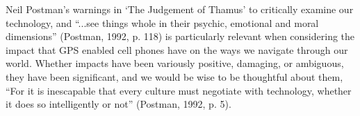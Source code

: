 \documentclass[a4paper]{article}
\begin{document}
Neil Postman’s warnings in ‘The Judgement of Thamus’ to critically examine our technology, and “...see things whole in their psychic, emotional and moral dimensions” (Postman, 1992, p. 118) is particularly relevant when considering the impact that GPS enabled cell phones have on the ways we navigate through our world. Whether impacts have been variously positive, damaging, or ambiguous, they have been significant, and we would be wise to be thoughtful about them, “For it is inescapable that every culture must negotiate with technology, whether it does so intelligently or not” (Postman, 1992, p. 5).



\end{document}
